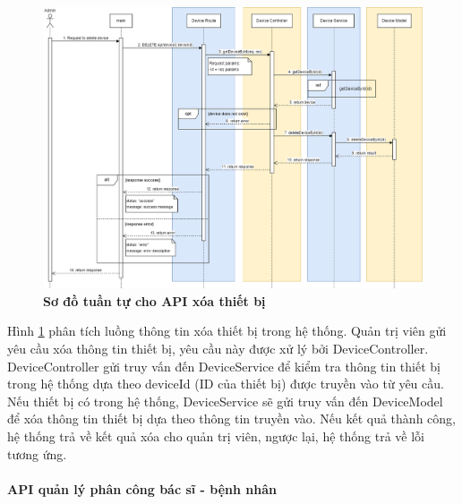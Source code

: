  \begin{figure}[H]
  \centering
  \includegraphics[scale=0.4]{Images/sequence_api/deleteDeviceById.png}
  \caption[Sơ đồ tuần tự cho API xóa thiết bị]{\bfseries \fontsize{12pt}{0pt}
  \selectfont Sơ đồ tuần tự cho API xóa thiết bị }
  \label{api_deleteDeviceById} %
\end{figure}
Hình \ref{api_deleteDeviceById} phân tích luồng thông tin xóa thiết bị trong hệ thống. Quản trị viên gửi yêu cầu xóa thông tin thiết bị, 
yêu cầu này được xử lý bởi DeviceController. DeviceController gửi truy vấn đến DeviceService để kiểm tra thông tin thiết bị trong hệ thống dựa theo deviceId (ID của thiết bị) được truyền vào từ yêu cầu. 
Nếu thiết bị có trong hệ thống, DeviceService sẽ gửi truy vấn đến DeviceModel để xóa thông tin thiết bị 
dựa theo thông tin truyền vào. Nếu kết quả thành công, hệ thống trả về kết quả xóa cho quản trị viên, ngược lại, hệ thống trả về lỗi tương ứng.



\paragraph{API quản lý phân công bác sĩ - bệnh nhân}
\mbox{}


